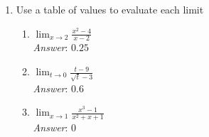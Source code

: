 \documentclass[11pt]{article}
\begin{document}
\begin{enumerate}
\begin{enumerate}
\end{enumerate}






\item Use a table of values to evaluate each limit

\begin{enumerate}

\item $\lim_{x\to 2} \frac{x^2 -4}{x - 2}$\\

{\em Answer}:  $0.25$\\

\item $\lim_{t \to 0} \frac{t - 9}{\sqrt{t} - 3}$\\



{\em Answer}:  $0.6$\\

\item $\lim_{x\rightarrow 1} \frac{x^3 - 1}{x^2 + x + 1}$\\


{\em Answer}:  0\\



\end{enumerate}

\newpage





\end{enumerate}
\end{document}
